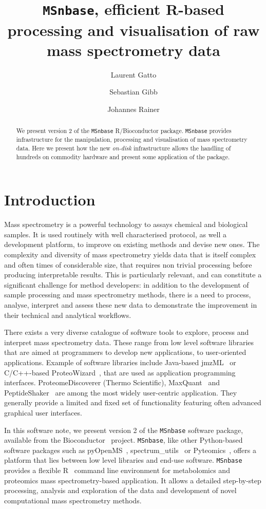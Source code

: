 \documentclass[journal=jacsat,manuscript=article]{achemso}\usepackage[]{graphicx}\usepackage[]{color}
\author{Laurent Gatto}
\affiliation[UCLouvain]{Computational Biology Unit, de Duve Institute, Universit\'e catholique de Louvain, Brussels, Belgium}
\author{Sebastian Gibb}
\affiliation[University of Greifswald]{Department of Anaesthesiology and Intensive Care of the University Medicine Greifswald, Germany}
\author{Johannes Rainer}
\affiliation[EURAC]{Institute for Biomedicine, Eurac Research, Affiliated Institute of the University of L\"ubeck, Bolzano, Italy}
\title[MSnbase version 2]
  {\texttt{MSnbase}, efficient R-based processing and visualisation of raw mass spectrometry data}
\begin{document}

\begin{abstract} %
  We present version 2 of the \texttt{MSnbase} R/Bioconductor
  package. \texttt{MSnbase} provides infrastructure for the
  manipulation, processing and visualisation of mass spectrometry
  data. Here we present how the new \textit{on-disk} infrastructure
  allows the handling of hundreds on commodity hardware and present
  some application of the package.
\end{abstract}



\section{Introduction}

Mass spectrometry is a powerful technology to assays chemical and
biological samples. It is used routinely with well characterised
protocol, as well a development platform, to improve on existing
methods and devise new ones. The complexity and diversity of mass
spectrometry yields data that is itself complex and often times of
considerable size, that requires non trivial processing before
producing interpretable results. This is particularly relevant, and
can constitute a significant challenge for method developers: in
addition to the development of sample processing and mass spectrometry
methods, there is a need to process, analyse, interpret and assess
these new data to demonstrate the improvement in their technical and
analytical workflows.

There exists a very diverse catalogue of software tools to explore,
process and interpret mass spectrometry data. These range from low
level software libraries that are aimed at programmers to develop new
applications, to user-oriented applications. Example of software
libraries include Java-based jmzML~\cite{Cote:2010} or C/C++-based
ProteoWizard~\cite{Chambers:2012}, that are used as application
programming interfaces. ProteomeDiscoverer (Thermo Scientific),
MaxQuant~\cite{Cox:2008} and PeptideShaker~\cite{Vaudel:2015} are
among the most widely user-centric application. They generally provide
a limited and fixed set of functionality featuring often advanced
graphical user interfaces.

In this software note, we present version 2 of the \texttt{MSnbase}
\cite{Gatto:2012} software package, available from the
Bioconductor~\cite{Huber:2015} project. \texttt{MSnbase}, like other
Python-based software packages such as {pyOpenMS}~\cite{Rost:2014},
spectrum\_utils~\cite{Bittremieux:2020} or
Pyteomics~\cite{Goloborodko:2013}, offers a platform that lies between
low level libraries and end-use software. \texttt{MSnbase} provides a
flexible R~\cite{R} command line environment for metabolomics and
proteomics mass spectrometry-based application. It allows a detailed
step-by-step processing, analysis and exploration of the data and
development of novel computational mass spectrometry methods.
\end{document}
